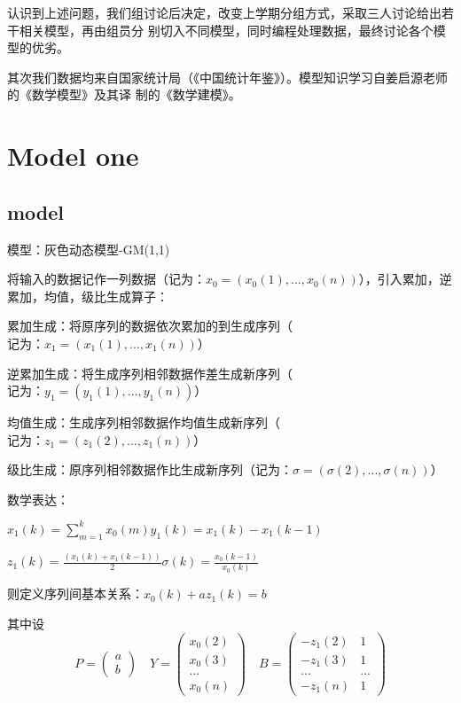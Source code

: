 \documentclass{article}
\begin{document}
认识到上述问题，我们组讨论后决定，改变上学期分组方式，采取三人讨论给出若干相关模型，再由组员分
别切入不同模型，同时编程处理数据，最终讨论各个模型的优劣。

其次我们数据均来自国家统计局（《中国统计年鉴》）。模型知识学习自姜启源老师的《数学模型》及其译
制的《数学建模》。



\section{Model one}

\subsection{model}
模型：灰色动态模型-GM(1,1)

将输入的数据记作一列数据（$记为：x_0=(x_0(1),...,x_0(n))$），引入累加，逆累加，均值，级比生成算子：

累加生成：将原序列的数据依次累加的到生成序列（$记为：x_1=(x_1(1),...,x_1(n))$）

逆累加生成：将生成序列相邻数据作差生成新序列（$记为：y_1=(y_1(1),...,y_1(n))$）

均值生成：生成序列相邻数据作均值生成新序列（$记为：z_1=(z_1(2),...,z_1(n))$）

级比生成：原序列相邻数据作比生成新序列（$记为：\sigma=(\sigma(2),...,\sigma(n))$）

数学表达：

$x_1(k)=\sum_{m=1}^kx_0(m)$\qquad\qquad\qquad\qquad\;$y_1(k)=x_1(k)-x_1(k-1)$

$z_1(k)=\frac{(x_1(k)+x_1(k-1))}{2}$\qquad\qquad\qquad\qquad$\sigma(k)=\frac{x_0(k-1)}{x_0(k)}$

则定义序列间基本关系：$x_0(k)+az_1(k)=b$

其中设
\begin{equation}
	P=
	\begin{pmatrix}
		a\\
		b
	\end{pmatrix}
\quad
	Y=
	\begin{pmatrix}
		x_0(2)\\
		x_0(3)\\
		...\\
		x_0(n)
	\end{pmatrix}
\quad
	B=
	\begin{pmatrix}
		-z_1(2) & 1\\
		-z_1(3) & 1\\
		... & ...\\
		-z_1(n) & 1
	\end{pmatrix}
\end{equation}
\end{document}
